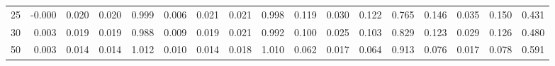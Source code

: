 \begin{tabular}{c r r r r r r r r r r r r r r r r}
25 &     -0.000 &      0.020 &      0.020 &      0.999 &      0.006 &      0.021 &      0.021 &      0.998 &      0.119 &      0.030 &      0.122 &      0.765 &      0.146 &      0.035 &      0.150 &      0.431\\
30 &      0.003 &      0.019 &      0.019 &      0.988 &      0.009 &      0.019 &      0.021 &      0.992 &      0.100 &      0.025 &      0.103 &      0.829 &      0.123 &      0.029 &      0.126 &      0.480\\
50 &      0.003 &      0.014 &      0.014 &      1.012 &      0.010 &      0.014 &      0.018 &      1.010 &      0.062 &      0.017 &      0.064 &      0.913 &      0.076 &      0.017 &      0.078 &      0.591\\[0pt]
\bottomrule 
\end{tabular}
